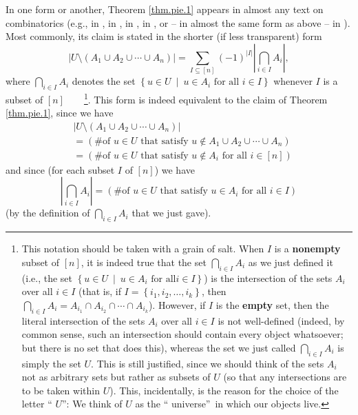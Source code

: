 In one form or another, Theorem \ref{thm.pie.1} appears in almost any text on
combinatorics (e.g., in \cite[Theorem 2.1.1]{Sagan19}, in \cite[\S 4.11]%
{Loehr-BC}, in \cite[Theorem 5.3]{Strick20}, in \cite[Theorem 2.9.7]{19fco},
or -- in almost the same form as above -- in \cite[Theorem 7.8.6]{20f}). Most
commonly, its claim is stated in the shorter (if less transparent) form%
\[
\left\vert U\setminus\left(  A_{1}\cup A_{2}\cup\cdots\cup A_{n}\right)
\right\vert =\sum_{I\subseteq\left[  n\right]  }\left(  -1\right)
^{\left\vert I\right\vert }\left\vert \bigcap\limits_{i\in I}A_{i}\right\vert
,
\]
where $\bigcap\limits_{i\in I}A_{i}$ denotes the set $\left\{  u\in
U\ \mid\ u\in A_{i}\text{ for all }i\in I\right\}  $ whenever $I$ is a subset
of $\left[  n\right]  $\ \ \ \ \footnote{This notation should be taken with a
grain of salt. When $I$ is a \textbf{nonempty} subset of $\left[  n\right]  $,
it is indeed true that the set $\bigcap\limits_{i\in I}A_{i}$ as we just
defined it (i.e., the set $\left\{  u\in U\ \mid\ u\in A_{i}\text{ for all
}i\in I\right\}  $) is the intersection of the sets $A_{i}$ over all $i\in I$
(that is, if $I=\left\{  i_{1},i_{2},\ldots,i_{k}\right\}  $, then
$\bigcap\limits_{i\in I}A_{i}=A_{i_{1}}\cap A_{i_{2}}\cap\cdots\cap A_{i_{k}}%
$). However, if $I$ is the \textbf{empty} set, then the literal intersection
of the sets $A_{i}$ over all $i\in I$ is not well-defined (indeed, by common
sense, such an intersection should contain every object whatsoever; but there
is no set that does this), whereas the set we just called $\bigcap
\limits_{i\in I}A_{i}$ is simply the set $U$. This is still justified, since
we should think of the sets $A_{i}$ not as arbitrary sets but rather as
subsets of $U$ (so that any intersections are to be taken within $U$). This,
incidentally, is the reason for the choice of the letter \textquotedblleft%
$U$\textquotedblright: We think of $U$ as the \textquotedblleft
universe\textquotedblright\ in which our objects live.}. This form is indeed
equivalent to the claim of Theorem \ref{thm.pie.1}, since we have%
\begin{align*}
&  \left\vert U\setminus\left(  A_{1}\cup A_{2}\cup\cdots\cup A_{n}\right)
\right\vert \\
&  =\left(  \text{\# of }u\in U\text{ that satisfy }u\notin A_{1}\cup
A_{2}\cup\cdots\cup A_{n}\right) \\
&  =\left(  \text{\# of }u\in U\text{ that satisfy }u\notin A_{i}\text{ for
all }i\in\left[  n\right]  \right)
\end{align*}
and since (for each subset $I$ of $\left[  n\right]  $) we have%
\[
\left\vert \bigcap\limits_{i\in I}A_{i}\right\vert =\left(  \text{\# of }u\in
U\text{ that satisfy }u\in A_{i}\text{ for all }i\in I\right)
\]
(by the definition of $\bigcap\limits_{i\in I}A_{i}$ that we just gave).

